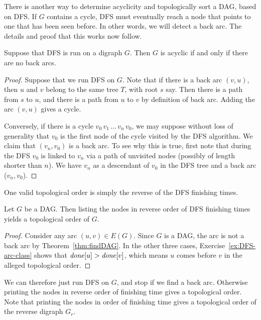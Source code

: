 There is another way to determine acyclicity and topologically sort a
DAG, based on DFS. If $G$ contains a cycle,  DFS must eventually reach
a node that points to one that has been seen before. In other words, we
will detect a back arc. The details and proof that this works now follow.

\begin{Theorem}
\label{thm:findDAG}
Suppose that DFS is run on a digraph $G$. Then $G$ is acyclic if and
only if there are no back arcs.
\end{Theorem}

\begin{proof}
Suppose that we run DFS on $G$. Note that if there is a
back arc $(v, u)$, then $u$ and $v$ belong to the same tree $T$, with
root $s$ say. Then there is a path from $s$ to $u$, and there is a path
from $u$ to $v$ by definition of back arc. Adding the arc $(v, u)$ gives
a cycle. 

Conversely, if there is a cycle $v_0\, v_1\, \dots \, v_n\, v_0$, we may
suppose without loss of generality that $v_0$ is the first node of the
cycle  visited by the DFS algorithm. We claim that $(v_n, v_0)$ is a
back arc. To see why this is true, first note that during the DFS $v_0$ is 
linked to $v_n$ via a path of unvisited nodes (possibly of length shorter 
than $n$).  We have $v_n$ as a descendant of $v_0$ in the DFS tree and
a back arc ($v_n, v_0$).
\end{proof}

One valid topological order is simply the reverse of the DFS finishing times.

\begin{Theorem}
Let $G$ be a DAG. Then listing the nodes in reverse order of DFS
finishing times yields a topological order of $G$.
\end{Theorem}

\begin{proof} 
Consider any arc $(u,v)\in E(G)$. Since $G$ is a DAG,
the arc is not a back arc by Theorem~\ref{thm:findDAG}. In the other three
cases, Exercise~\ref{ex:DFS-arc-class} shows that $\operatorname{\text{\textit{done}}}[u] > \operatorname{\text{\textit{done}}}[v]$,
which means $u$ comes before $v$ in the alleged topological order.
\end{proof}

We can therefore just run DFS on $G$, and stop if we find a back
arc. Otherwise printing the nodes in reverse order of finishing time
gives a topological order. Note that printing the nodes in order of
finishing time gives a topological order of the reverse digraph $G_r$.

